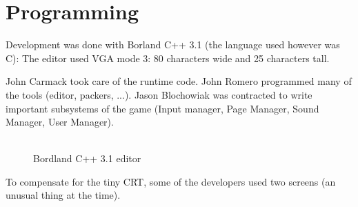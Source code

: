 \documentclass[book.tex]{subfiles}
\begin{document}
\section{Programming}



Development was done with Borland C++ 3.1 (the language used however was C): The editor used VGA mode 3: 80 characters wide and 25 characters tall.

John Carmack took care of the runtime code. John Romero programmed many of the tools (editor, packers, ...). Jason Blochowiak was contracted to write important subsystems of the game (Input manager, Page Manager, Sound Manager, User Manager).\\
\\
\begin{figure}[H]
\centering
\caption{Bordland C++ 3.1 editor}
\end{figure}


To compensate for the tiny CRT, some of the developers used two screens (an unusual thing at the time).\\
\end{document}
